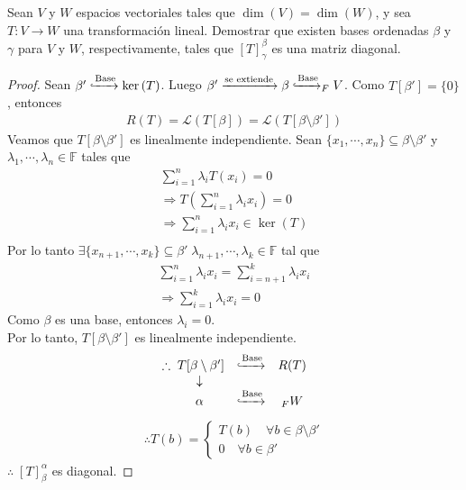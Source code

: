 \documentclass[11pt]{article}
\numberwithin{equation}{section}
\newcommand{\F}{\mathbb{F}}
\begin{document}
\begin{Problema}{} Sean $V$ y $W$ espacios vectoriales tales que $\dim(V) = \dim(W)$, y sea $T: V \to W$ una transformación lineal. 
    Demostrar que existen bases ordenadas $\beta$ y $\gamma$ para $V$ y $W$, respectivamente, tales que $[T]_{\gamma }^{\beta}$ es una matriz diagonal.
\end{Problema}      
\begin{proof}
Sean $\beta' \xhookrightarrow{\text{Base}} \ker{(T)}$. Luego $\beta' \xrightarrow{\text{se extiende}} \beta \xhookrightarrow{\text{Base}} _FV$. 
Como $T[\beta']=\{0\}$, entonces
\begin{align*}
    R(T)=\mathcal{L}(T[\beta])=\mathcal{L}(T[\beta\setminus\beta'])
\end{align*}
Veamos que $T[\beta\setminus\beta']$ es linealmente independiente. Sean $\{x_1,\cdots,x_n\}\subseteq \beta\setminus\beta'$ y $\lambda_1,\cdots,\lambda_n\in \F$ tales que
\begin{align*}
    \sum_{i=1}^{n}\lambda_i T(x_i)=0 \\
    \Rightarrow T(\sum_{i=1}^{n}\lambda_i x_i)=0 \\
    \Rightarrow \sum_{i=1}^{n}\lambda_i x_i \in \ker{(T)} \\
\end{align*}
Por lo tanto $\exists \{x_{n+1},\cdots ,x_k\}\subseteq \beta'\; \lambda_{n+1},\cdots, \lambda_k \in \F$ tal que 
\begin{align*}
    \sum_{i=1}^{n}\lambda_i x_i =\sum_{i=n+1}^{k}\lambda_i x_i\\
    \Rightarrow \sum_{i=1}^{k}\lambda_i x_i =0
\end{align*}
Como $\beta$ es una base, entonces $\lambda_i = 0$.\\
Por lo tanto, $T[\beta\setminus\beta']$ es linealmente independiente.\\
    \[
    \begin{array}{c}
        \begin{array}{ccc}
            \therefore\; T[\beta\setminus\beta'] & \xhookrightarrow{\text{Base}} & R(T) \\
            \quad \downarrow &  & \\
            \quad\alpha& \xhookrightarrow{\text{Base}} & _FW
        \end{array}
    \end{array}
    \]
\begin{align*}
    \therefore T(b)=\begin{cases*}
        T(b) \quad \forall b\in \beta\setminus\beta' \\
        0 \quad \forall b\in \beta'
    \end{cases*}
\end{align*}
$\therefore\; [T]_{\beta}^{\alpha}$ es diagonal.
\end{proof}
\end{document}
